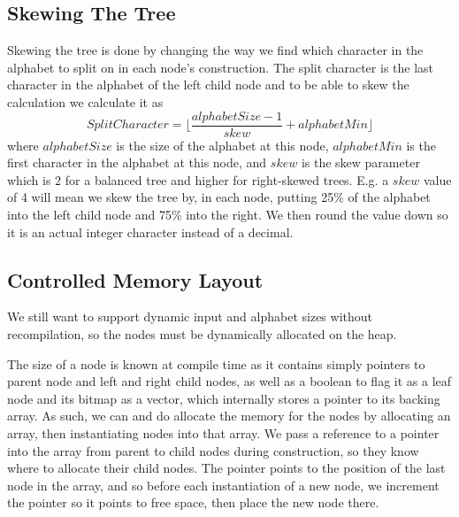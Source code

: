 \subsection{Skewing The Tree}
\label{sec:SkewingTheTree}
Skewing the tree is done by changing the way we find which character in the alphabet to split on in each node's construction.
The split character is the last character in the alphabet of the left child node and to be able to skew the calculation we calculate it as
\[SplitCharacter = \lfloor \frac{alphabetSize-1}{skew} + alphabetMin \rfloor \]
where $alphabetSize$ is the size of the alphabet at this node, $alphabetMin$ is the first character in the alphabet at this node, and $skew$ is the skew parameter which is 2 for a balanced tree and higher for right-skewed trees. E.g. a $skew$ value of 4 will mean we skew the tree by, in each node, putting 25\% of the alphabet into the left child node and 75\% into the right.
We then round the value down so it is an actual integer character instead of a decimal.


\subsection{Controlled Memory Layout}
We still want to support dynamic input and alphabet sizes without recompilation, so the nodes must be dynamically allocated on the heap.

The size of a node is known at compile time as it contains simply pointers to parent node and left and right child nodes, as well as a boolean to flag it as a leaf node and its bitmap as a vector, which internally stores a pointer to its backing array.
As such, we can and do allocate the memory for the nodes by allocating an array, then instantiating nodes into that array.
We pass a reference to a pointer into the array from parent to child nodes during construction, so they know where to allocate their child nodes.
The pointer points to the position of the last node in the array, and so before each instantiation of a new node, we increment the pointer so it points to free space, then place the new node there.

